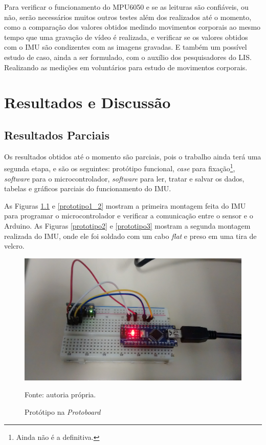 	Para verificar o funcionamento do MPU6050  e se as leituras são confiáveis, ou não, serão necessários muitos outros testes além dos realizados até o momento, como a comparação dos valores obtidos medindo movimentos corporais ao mesmo tempo que uma gravação de vídeo é realizada, e verificar se os valores obtidos com o IMU são condizentes com as imagens gravadas. E também um possível estudo de caso, ainda a ser formulado, com o auxílio dos pesquisadores do LIS. Realizando as medições em voluntários para estudo de movimentos corporais. 
	
	
\chapter{Resultados e Discussão}
	\section{Resultados Parciais}
	
	Os resultados obtidos até o momento são parciais, pois o trabalho ainda terá uma segunda etapa, e são os seguintes: protótipo funcional, \textit{case} para fixação\footnote{Ainda não é a definitiva.}, \textit{software} para o microcontrolador, \textit{software} para ler, tratar e salvar os dados, tabelas e gráficos parciais do funcionamento do IMU.
	
	As Figuras \ref{prototipo1} e \ref{prototipo1_2} mostram a primeira montagem feita do IMU para programar o microcontrolador e verificar a comunicação entre o sensor e o Arduino. As Figuras \ref{prototipo2} e \ref{prototipo3} mostram a segunda montagem realizada do IMU, onde ele foi soldado com um cabo \textit{flat} e preso em uma tira de velcro.
	
	\begin{figure}[h]
		\centering
		\includegraphics[keepaspectratio=true,scale=0.15]{figuras/prototipo1.jpg}
		\caption{Protótipo na \textit{Protoboard}}
		Fonte: autoria própria. 
		\label{prototipo1}	
	\end{figure}
	 
